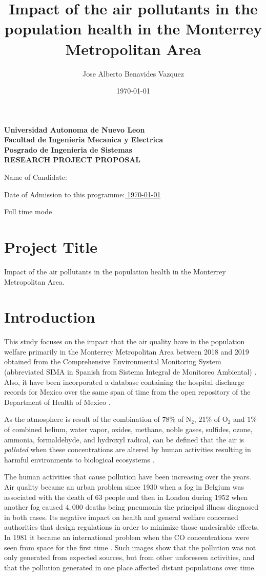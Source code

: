 \documentclass[
  11pt,
  a4paper,
  oneside
]{article}
\author{Jose Alberto Benavides Vazquez}
\date{\today}
\title{Impact of the air pollutants in the population health in the Monterrey Metropolitan Area}
\newcommand{\titlepart}{\thispagestyle{empty}
\pdfbookmark[0]{Front Page}{Front Page}
\label{sec:frontpage}
\begin{center}
\textbf{Universidad Autonoma de Nuevo Leon\\
Facultad de Ingenieria Mecanica y Electrica\\
Posgrado de Ingenieria de Sistemas\\
\vspace{3ex}
RESEARCH PROJECT PROPOSAL}
\end{center}

\vspace{6ex}

Name of Candidate:\uline{
\phantom{xxxxxxxxxxxxxxxxxxx}
\theauthor
\hfill\phantom{x}}

\vspace{3ex}

Date of Admission to this programme:\uline{
\phantom{xxxxx}
\admissionDate
\hfill\phantom{x}}

\vspace{3ex}

\studyTimeMode

\leftskip=0.32in}
\newcommand{\admissionDate}{\today}
\newcommand{\studyTimeMode}{Full time mode}
\begin{document}
\titlepart


\section{Project Title}
Impact of the air pollutants in the population health in the Monterrey Metropolitan Area.

\section{Introduction}
This study focuses on the impact that the air quality have in the population welfare primarily in the Monterrey Metropolitan Area between 2018 and 2019 obtained from the Comprehensive Environmental Monitoring System (abbreviated SIMA in Spanish from Sistema Integral de Monitoreo Ambiental) \citep{aireNL}. Also, it have been incorporated a database containing the hospital discharge records for Mexico over the same span of time from the open repository of the Department of Health of Mexico \cite{mexGobSS2020}.

As the atmosphere is result of the combination of $78\%$ of N$_2$,  $21\%$ of O$_2$ and $1\%$ of combined helium, water vapor, oxides, methane, noble gases, sulfides, ozone, ammonia, formaldehyde, and hydroxyl radical, can be defined that the air is \textit{polluted} when these concentrations are altered by human activities resulting in harmful environments to biological ecosystems \citep{thadEA2015}.

The human activities that cause pollution have been increasing over the years. Air quality became an urban problem since 1930 when a fog in Belgium was associated with the death of $63$ people and then in London during 1952 \citep{firket1936} when another fog caused $4,000$ deaths \citep{logan1953} being pneumonia the principal illness diagnosed in both cases. Its negative impact on health and general welfare concerned authorities that design regulations in order to minimize those undesirable effects. In 1981 it became an international problem when the CO concentrations were seen from space for the first time \citep{akimoto2003}. Such images show that the pollution was not only generated from expected sources, but from other unforeseen activities, and that the pollution generated in one place affected distant populations over time. 
\end{document}
